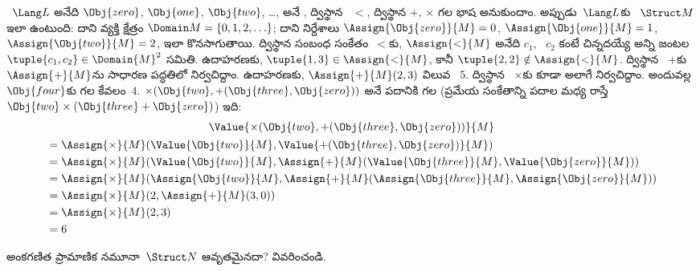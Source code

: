 \documentclass[../../../include/open-logic-section]{subfiles}
\begin{document}
\begin{ex}
~$\Lang L$ అనేది $\Obj{zero}$, $\Obj{one}$, $\Obj{two}$, \dots, అనే
, ద్విస్థాన ~$<$, ద్విస్థాన 
$+$, $\times$ గల భాష అనుకుందాం. అప్పుడు~$\Lang L$కు ~$\Struct
M$ ఇలా ఉంటుంది: దాని వ్యక్తి క్షేత్రం $\Domain M = \{0, 1, 2, \ldots
\}$; దాని నిర్దేశాలు $\Assign{\Obj{zero}}{M} = 0$,
$\Assign{\Obj{one}}{M} = 1$, $\Assign{\Obj{two}}{M} = 2$, ఇలా
కొనసాగుతాయి. ద్విస్థాన సంబంధ సంకేతం~$<$కు, $\Assign{<}{M}$ అనేది
$c_1$, ~$c_2$ కంటే చిన్నదయ్యే అన్ని జంటల
$\tuple{c_1, c_2} \in \Domain{M}^2$ సమితి. ఉదాహరణకు,
$\tuple{1, 3} \in \Assign{<}{M}$, కానీ
$\tuple{2, 2} \notin \Assign{<}{M}$. ద్విస్థాన ~$+$కు
$\Assign{+}{M}$ను సాధారణ పద్ధతిలో నిర్వచిద్దాం. ఉదాహరణకు,
$\Assign{+}{M}(2,3)$ విలువ ~$5$. ద్విస్థాన
~$\times$కు కూడా అలాగే నిర్వచిద్దాం. అందువల్ల $\Obj{four}$కు గల
 కేవలం~$4$. $\times(\Obj{two},
+(\Obj{three},\Obj{zero}))$ అనే పదానికి గల  (ప్రమేయ సంకేతాన్ని పదాల మధ్య రాస్తే
$\Obj{two} \times (\Obj{three} + \Obj{zero})$) ఇది:
\begin{multline*}
\Value{\times(\Obj{two}, +(\Obj{three},\Obj{zero}))}{M}\\
\begin{aligned}
& =\Assign{\times}{M}(\Value{\Obj{two}}{M}, \Value{+(\Obj{three}, \Obj{zero})}{M})\\
& = \Assign{\times}{M}(\Value{\Obj{two}}{M}, \Assign{+}{M}(\Value{\Obj{three}}{M},
\Value{\Obj{zero}}{M})) \\
& = \Assign{\times}{M}(\Assign{\Obj{two}}{M}, \Assign{+}{M}(\Assign{\Obj{three}}{M},
\Assign{\Obj{zero}}{M})) \\
& = \Assign{\times}{M}(2, \Assign{+}{M}(3, 0)) \\
& = \Assign{\times}{M}(2, 3) \\
& = 6
\end{aligned}
\end{multline*}
\end{ex}

\begin{prob}
అంకగణిత ప్రామాణిక నమూనా~$\Struct N$ ఆవృతమైనదా? వివరించండి.
\end{prob}
\end{document}

